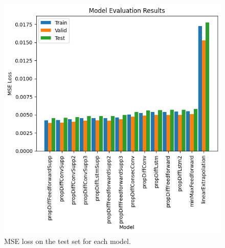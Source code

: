 \documentclass[conference]{IEEEtran}
\begin{document}
\begin{figure}
    \centering
    \includegraphics[width=\columnwidth]{figures/testLosses.png}
    \caption{MSE loss on the test set for each model.}
    \label{figure:testLosses}
\end{figure}
\end{document}
